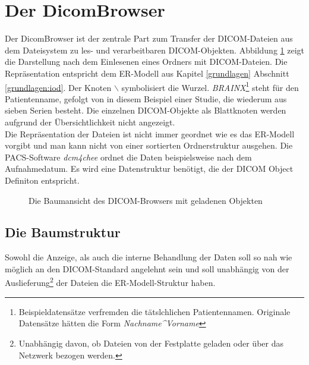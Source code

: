 \section{Der DicomBrowser}
Der DicomBrowser ist der zentrale Part zum Transfer der DICOM-Dateien aus dem Dateisystem zu les- und verarbeitbaren DICOM-Objekten. Abbildung \ref{dicombrowser} zeigt die Darstellung nach dem Einlesenen eines Ordners mit DICOM-Dateien. Die Repräsentation entspricht dem ER-Modell aus Kapitel \ref{grundlagen} Abschnitt \ref{grundlagen:iod}. Der Knoten $\backslash$ symbolisiert die Wurzel. \textit{BRAINX}\footnote{Beispieldatensätze verfremden die tätslchlichen Patientennamen. Originale Datensätze hätten die Form \textit{Nachname\^{}Vorname}} steht für den Patientenname, gefolgt von in diesem Beispiel einer Studie, die wiederum aus sieben Serien besteht. Die einzelnen DICOM-Objekte als Blattknoten werden aufgrund der Übersichtlichkeit nicht angezeigt.\\
Die Repräsentation der Dateien ist nicht immer geordnet wie es das ER-Modell vorgibt und man kann nicht von einer sortierten Ordnerstruktur ausgehen. Die PACS-Software \textit{dcm4chee} ordnet die Daten beispielsweise nach dem Aufnahmedatum. Es wird eine Datenstruktur benötigt, die der DICOM Object Definiton entspricht.

\begin{figure}[htbp]
  \vspace{0.5cm}
  \centering
   \caption{Die Baumansicht des DICOM-Browsers mit geladenen Objekten}
  \label{dicombrowser}
  \vspace{0.5cm}
\end{figure}

\subsection{Die Baumstruktur}
Sowohl die Anzeige, als auch die interne Behandlung der Daten soll so nah wie möglich an den DICOM-Standard angelehnt sein und soll unabhängig von der Auslieferung\footnote{Unabhängig davon, ob Dateien von der Festplatte geladen oder über das Netzwerk bezogen werden.} der Dateien die ER-Modell-Struktur haben. 

